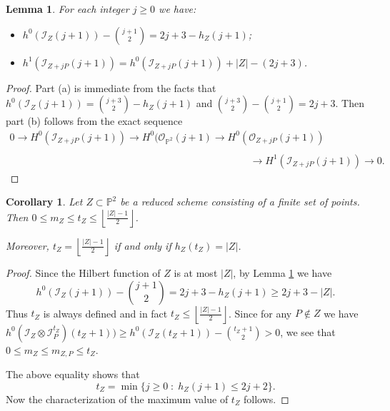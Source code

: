 \documentclass[12pt]{amsart}
\numberwithin{equation}{section}
\newtheorem{lemma}[theorem]{Lemma}
\newtheorem{corollary}[theorem]{Corollary}
\theoremstyle{definition}
\begin{document}
\begin{lemma}
  \label{lem:rewrite rhs} For each integer $j \ge 0$ we have:

\begin{itemize}
\item[(a)] 
$\displaystyle h^0(\mathcal I_Z(j+1)) - \binom{j+1}{2} = 2 j + 3 - h_Z (j+1)$;

\item[(b)] 
$\displaystyle h^1(\mathcal I_{Z+j P} (j +1)) = h^0(\mathcal I_{Z+j P} (j+1)) + |Z| - (2j +3)$.

\end{itemize}
\end{lemma}

\begin{proof}
Part (a) is immediate from the facts that  $h^0(\mathcal I_Z(j+1)) = \binom{j+3}{2} - h_Z (j+1)$ and 
$\binom{j+3}{2} - \binom{j+1}{2} = 2 j+3$. Then part (b) follows from the exact sequence
\[
\begin{array}{ll}
0 \rightarrow H^0(\mathcal I_{Z+j P} (j+1)) \rightarrow H^0(\mathcal O_{\mathbb P^2} (j +1) \rightarrow H^0(\mathcal O_{Z + j P}(j+1)) \\ \\
\hspace{4in} \rightarrow H^1 (\mathcal I_{Z + j P}(j+1)) \rightarrow 0.
 \end{array}
\]
\end{proof}

\begin{corollary}\label{mz<tzCor}
Let $Z \subset { \ensuremath{\mathbb{P}}}^2$ be a reduced scheme consisting of a finite set of points. Then
$0\le m_Z\leq t_Z \le \left \lfloor \frac{|Z| -1}{2} \right \rfloor$.

Moreover, $t_Z = \left \lfloor \frac{|Z| -1}{2} \right \rfloor$ if and only if $h_Z (t_Z) = |Z|$. 
\end{corollary}

\begin{proof}
Since the Hilbert function of $Z$ is at most $|Z|$, by Lemma \ref{lem:rewrite rhs} 
we have
\[
h^0(\mathcal I_Z(j+1)) - \binom{j+1}{2} = 2 j + 3 - h_Z (j+1)\geq 2j+3-|Z|.
\]
Thus $t_Z$ is always defined 
and in fact $t_Z \le \left \lfloor \frac{|Z| -1}{2} \right \rfloor$. 
Since for any $P\notin Z$ we have
$h^0(\mathcal I_Z \otimes \mathcal I_P^{t_Z})(t_Z+1))\geq h^0(\mathcal I_Z(t_Z+1)) - \binom{t_Z+1}{2}>0$,
we see that $0\leq m_Z\leq m_{Z,P}\leq t_Z$. 

The above equality shows  that 
\[
t_Z = \min \{j \ge 0 \; : \; h_Z (j+1) \le 2 j +2 \}. 
\]
Now the characterization of the maximum value of $t_Z$ follows. 
\end{proof}
\end{document}
